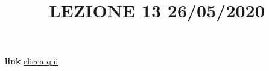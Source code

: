 \title{LEZIONE 13 26/05/2020}\newline
\textbf{link} \href{https://web.microsoftstream.com/video/e0ee5360-f8bc-40b2-8228-32c90d1e7853}{clicca qui}